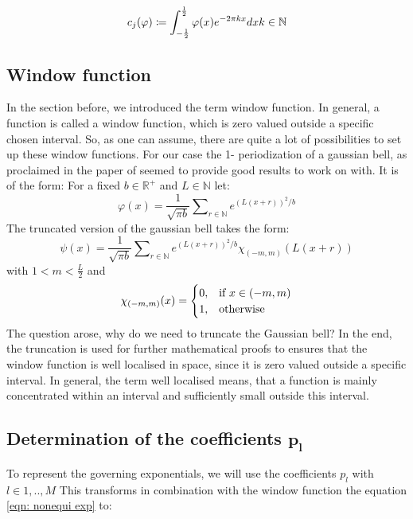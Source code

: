 \documentclass[11pt]{report} %
\begin{document}
\begin{equation}
c_{j} (\varphi) \coloneqq \int_{-\frac{1}{2}}^{\frac{1}{2}} \varphi (x) e^{-2 \pi kx} dx         
\space k \in \mathbb{N}
\end{equation}

\subsection{Window function}
In the section before, we introduced the term window function.
In general, a function is called a window function, which is zero valued outside a specific chosen interval.
So, as one can assume, there are quite a lot of possibilities to set up these window functions.
For our case the 1- periodization of a gaussian bell, as proclaimed in the paper of \cite{Peter2011} seemed to provide good results to work on with.
It is of the form: 
For a fixed $b \in \mathbb{R}^+$ and $L \in{\mathbb{N}}$ let:
\begin{equation}
\varphi(x)= \frac{1}{\sqrt{\pi b}} \sum\nolimits_{r \in \mathbb{N}}  e^{(L(x+r))^2/b}
\end{equation}
The truncated version of the gaussian bell takes the form: 
\begin{equation}
\psi(x)= \frac{1}{\sqrt{\pi b}} \sum\nolimits_{r \in \mathbb{N}}  e^{(L(x+r))^2/b}\chi_{(-m,m)}(L(x+r))
\end{equation}
with $1<m < \frac{L}{2}$ and
\begin{equation}
    \chi_{(-m,m)}(x)=
    \begin{cases}
      0, & \text{if}\ x\in (-m,m) \\
      1, & \text{otherwise}
    \end{cases}\notag
\end{equation} 
The question arose, why do we need to truncate the Gaussian bell? 
In the end, the truncation is used for further mathematical proofs to ensures that the window function is well localised in space, since it is zero valued outside a specific interval.
In general, the term well localised means, that a function is mainly concentrated within an interval and sufficiently small outside this interval.

\subsection{Determination of the coefficients $\bm{p_l}$}
To represent the governing exponentials, we will use the coefficients $p_l$ with $l \in{1,..,M}$    
This transforms in combination with the window function the equation \eqref{eqn: nonequi exp} to: 
\end{document}
